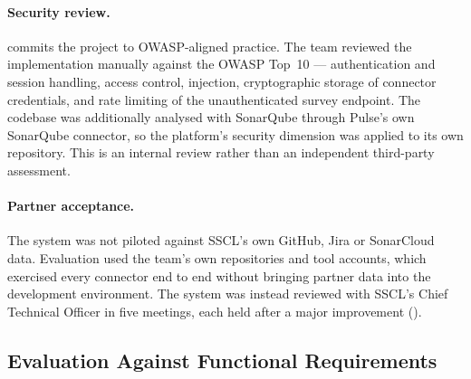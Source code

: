 \paragraph{Security review.}  commits the project to
OWASP-aligned practice. The team reviewed the implementation manually against
the OWASP Top~10 --- authentication and session handling, access control,
injection, cryptographic storage of connector credentials, and rate limiting of
the unauthenticated survey endpoint. The codebase was additionally analysed with
SonarQube through Pulse's own SonarQube connector, so the platform's security
dimension was applied to its own repository. This is an internal review rather
than an independent third-party assessment.

\paragraph{Partner acceptance.} The system was not piloted against SSCL's own
GitHub, Jira or SonarCloud data. Evaluation used the team's own repositories and
tool accounts, which exercised every connector end to end without bringing
partner data into the development environment. The system was instead reviewed
with SSCL's Chief Technical Officer in five meetings, each held after a major
improvement ().

\subsection{Evaluation Against Functional Requirements}
\label{subsec:eval-fr}

